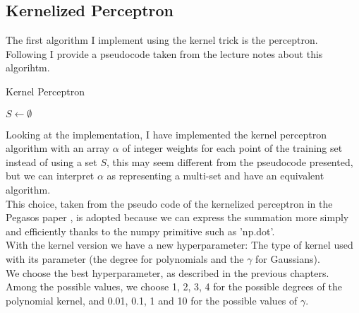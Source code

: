\subsection{Kernelized Perceptron}

The first algorithm I implement using the kernel trick is the perceptron.\\
Following I provide a pseudocode taken from the lecture notes about this algorihtm.\\ 



\begin{algorithm}[H]
    \SetAlgoLined
    \DontPrintSemicolon
    \caption{Kernel Perceptron}
    $S \leftarrow \emptyset$ \\
\end{algorithm}

Looking at the implementation, I have implemented the kernel perceptron algorithm with an array $\alpha$ of integer weights for each point of the training set instead of using a set $S$, this may seem different from the pseudocode presented, but we can interpret $\alpha$ as representing a multi-set and have an equivalent algorithm.\\
This choice, taken from the pseudo code of the kernelized perceptron in the Pegasos paper \cite{Pegasos_paper}, is adopted because we can express the summation more simply and efficiently thanks to the numpy primitive such as 'np.dot'.\\

With the kernel version we have a new hyperparameter: The type of kernel used with its parameter (the degree for polynomials and the $\gamma$ for Gaussians).\\
We choose the best hyperparameter, as described in the previous chapters.\\
Among the possible values, we choose 1, 2, 3, 4 for the possible degrees of the polynomial kernel, and 0.01, 0.1, 1 and 10 for the possible values of $\gamma$.\\

